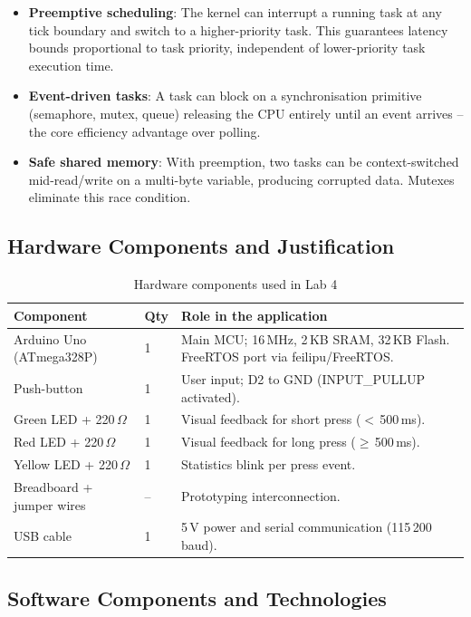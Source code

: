 \documentclass[12pt]{article}
\begin{document}
\begin{itemize}
    \item \textbf{Preemptive scheduling}: The kernel can interrupt a running task at any tick boundary and switch to a higher-priority task. This guarantees latency bounds proportional to task priority, independent of lower-priority task execution time.
    \item \textbf{Event-driven tasks}: A task can block on a synchronisation primitive (semaphore, mutex, queue) releasing the CPU entirely until an event arrives -- the core efficiency advantage over polling.
    \item \textbf{Safe shared memory}: With preemption, two tasks can be context-switched mid-read/write on a multi-byte variable, producing corrupted data. Mutexes eliminate this race condition.
\end{itemize}

\subsection{Hardware Components and Justification}

\begin{table}[H!]
\centering
\begin{tabular}{p{4cm} p{2cm} p{7cm}}
\toprule
\textbf{Component} & \textbf{Qty} & \textbf{Role in the application} \\
\midrule
Arduino Uno (ATmega328P) & 1 & Main MCU; 16\,MHz, 2\,KB SRAM, 32\,KB Flash. FreeRTOS port via feilipu/FreeRTOS. \\
Push-button & 1 & User input; D2 to GND (INPUT\_PULLUP activated). \\
Green LED + 220\,$\Omega$ & 1 & Visual feedback for short press ($<$\,500\,ms). \\
Red LED + 220\,$\Omega$ & 1 & Visual feedback for long press ($\geq$\,500\,ms). \\
Yellow LED + 220\,$\Omega$ & 1 & Statistics blink per press event. \\
Breadboard + jumper wires & -- & Prototyping interconnection. \\
USB cable & 1 & 5\,V power and serial communication (115\,200 baud). \\
\bottomrule
\end{tabular}
\caption{Hardware components used in Lab 4}
\label{tab:hardware}
\end{table}

\subsection{Software Components and Technologies}
\end{document}
